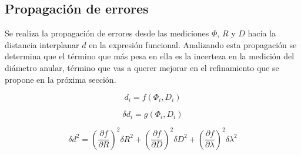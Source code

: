 \documentclass[a4paper, 10pt, spanish]{article}
\numberwithin{equation}{section}
\numberwithin{table}{section}
\begin{document}






\subsection{Propagación de errores}

Se realiza la propagación de errores desde las mediciones $\Phi$, $R$ y $D$ hacía la distancia interplanar $d$ en la expresión funcional. Analizando esta propagación se determina que el término que más pesa en ella es la incerteza en la medición del diámetro anular, término que vas a querer mejorar en el refinamiento que se propone en la próxima sección.
 
\begin{equation}
d_i = f(\Phi_i,D_i)  \nonumber
\end{equation}

\begin{equation}
\delta d_i = g(\Phi_i, D_i) \nonumber
\end{equation}


\begin{equation}
\delta d^2 = (\frac{\partial f}{\partial R})^2 \delta R^2 + (\frac{\partial f}{\partial D})^2 \delta D^2 + (\frac{\partial f}{\partial \lambda})^2 \delta \lambda^2  \nonumber
\end{equation}
\end{document}
